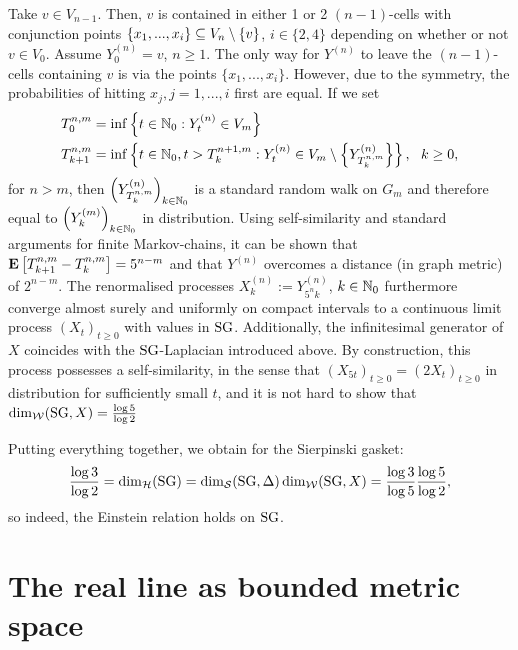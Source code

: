 Take $v\in V_{n-1}$. Then, $v$ is contained in either 1 or 2 $(n-1)$-cells with conjunction points 
$\{x_1,...,x_i\}\subseteq V_n\setminus\{v\}$, $i\in\{2,4\}$ depending on whether or not $v\in V_0$. Assume $Y^{(n)}_0=v$, $n\geq1$. The only way for $Y^{(n)}$ to leave the $(n-1)$-cells containing $v$ is via the points $\{x_1,...,x_i\}$. However, due to the symmetry, the probabilities of hitting $x_j, j=1,...,i$ first are equal. If we set 
\begin{align*}
  T^{n,m}_0&=\inf\left\{t\in\mathbb{N}_0:Y^{(n)}_t\in V_m\right\}\\
  T^{n,m}_{k+1} &=\inf\left\{t\in\mathbb{N}_0, t>T^{n+1,m}_k:
     Y^{(n)}_t\in V_m\setminus \left\{Y^{(n)}_{T^{n,m}_k}\right\}\right\},\ \ k\geq0,
\end{align*}
for $n>m$, then $\left(Y^{(n)}_{T^{n,m}_k}\right)_{k\in\mathbb{N}_0}$ is a standard random walk on $G_m$ and therefore equal to 
$\left(Y^{(m)}_k\right)_{k\in\mathbb{N}_0}$ in distribution. Using self-similarity and standard arguments for finite Markov-chains, it can be shown that $\mathbf{E}\left[{T^{n,m}_{k+1}-T^{n,m}_k}\right]=5^{n-m}$ and that $Y^{(n)}$ overcomes a distance (in graph metric) of $2^{n-m}$. The renormalised processes $X^{(n)}_k:=Y^{(n)}_{5^nk}$, $k\in\mathbb{N}_0$ furthermore converge almost surely and uniformly on compact intervals to a continuous limit process $(X_t)_{t\geq0}$ with values in $\operatorname{SG}$. Additionally, the infinitesimal generator of $X$ coincides with the $\operatorname{SG}$-Laplacian introduced above. 
By construction, this process possesses a self-similarity, in the sense that $(X_{5t})_{t\geq0}=(2X_t)_{t\geq0}$ in distribution for sufficiently small $t$, and it is not hard to show that $\dim_{\mathcal{W}}(\operatorname{SG},X)=\frac{\log 5}{\log 2}$

Putting everything together, we obtain for the Sierpinski gasket:
\[
  \frac{\log 3}{\log 2}=\dim_{\mathcal{H}}(\operatorname{SG})=\dim_{\mathcal{S}}(\operatorname{SG},\Delta)\dim_{\mathcal{W}}(\operatorname{SG},X)
  =\frac{\log 3}{\log 5}\frac{\log 5}{\log 2},
\]
so indeed, the Einstein relation holds on $\operatorname{SG}$.


\section{The real line as bounded metric space}


